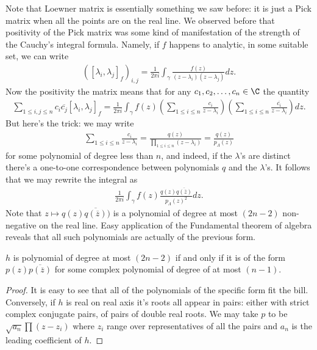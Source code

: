 Note that Loewner matrix is essentially something we saw before: it is just a Pick matrix when all the points are on the real line. We observed before that positivity of the Pick matrix was some kind of manifestation of the strength of the Cauchy's integral formula. Namely, if $f$ happens to analytic, in some suitable set, we can write
\begin{align*}
	\left([\lambda_{i}, \lambda_{j}]_{f}\right)_{i, j} = \frac{1}{2 \pi i}\int_{\gamma} \frac{f(z)}{(z - \lambda_{i})(z - \lambda_{j})} dz.
\end{align*}
Now the positivity the matrix means that for any $c_{1}, c_{2}, \ldots, c_{n} \in \C$ the quantity
\begin{align*}
	\sum_{1 \leq i, j \leq n} c_{i} \overline{c_{j}} [\lambda_{i}, \lambda_{j}]_{f} = \frac{1}{2 \pi i}\int_{\gamma}f(z) \left(\sum_{1 \leq i \leq n} \frac{c_{i}}{z - \lambda_{i}}\right) \left( \sum_{1 \leq i \leq n} \frac{\overline{c_{i}}}{z - \lambda_{i}}\right)dz.
\end{align*}
But here's the trick: we may write
\begin{align*}
	\sum_{1 \leq i \leq n} \frac{c_{i}}{z - \lambda_{i}} = \frac{q(z)}{\prod_{1 \leq i \leq n} (z - \lambda_{i})} = \frac{q(z)}{p_{\Lambda}(z)}
\end{align*}
for some polynomial of degree less than $n$, and indeed, if the $\lambda$'s are distinct there's a one-to-one correspondence between polynomials $q$ and the $\lambda$'s. It follows that we may rewrite the integral as
\begin{align*}
\frac{1}{2 \pi i}\int_{\gamma}f(z) \frac{q(z) \overline{q(\overline{z})}}{p_{\Lambda}(z)^2}dz.
\end{align*}
Note that $z \mapsto q(z)\overline{q(\overline{z})})$ is a polynomial of degree at most $(2 n - 2)$ non-negative on the real line. Easy application of the Fundamental theorem of algebra reveals that all such polynomials are actually of the previous form.

\begin{lem}\label{polynomial_lemma}
	$h$ is polynomial of degree at most $(2 n - 2)$ if and only if it is of the form $p(z) \overline{p(\overline{z})}$ for some complex polynomial of degree of at most $(n - 1)$.
\end{lem}
\begin{proof}
	It is easy to see that all of the polynomials of the specific form fit the bill. Conversely, if $h$ is real on real axis it's roots all appear in pairs: either with strict complex conjugate pairs, of pairs of double real roots. We may take $p$ to be $\sqrt{a_{n}}\prod (z - z_{i})$ where $z_{i}$ range over representatives of all the pairs and $a_{n}$ is the leading coefficient of $h$.
\end{proof}

